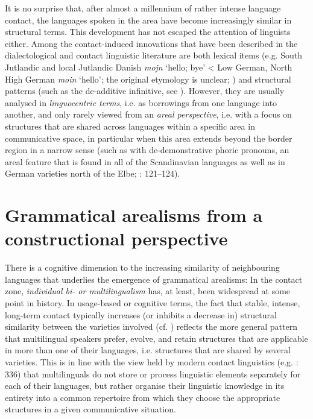 \documentclass[output=paper]{langsci/langscibook}
\begin{document}
It is no surprise that, after almost a millennium of rather intense language contact, the languages spoken in the area have become increasingly similar in structural terms. This development has not escaped the attention of linguists either. Among the contact-induced innovations that have been described in the dialectological and contact linguistic literature are both lexical items (e.g. South Jutlandic and local Jutlandic Danish \textit{mojn} ‘hello; bye’ < Low German, North High German \textit{moin} ‘hello’; the original etymology is unclear; \citealt{Pedersen.1995}) and structural patterns (such as the de-additive infinitive, see ). However, they are usually analysed in \textit{linguocentric terms}, i.e. as borrowings from one language into another, and only rarely viewed from an \textit{areal perspective}, i.e. with a focus on structures that are shared across languages within a specific area in communicative space, in particular when this area extends beyond the border region in a narrow sense (such as with de-demonstrative phoric pronouns, an areal feature that is found in all of the Scandinavian languages as well as in German varieties north of the Elbe; \citealt{Hoder.2016a}: 121–124).


\section{Grammatical arealisms from a constructional perspective} %
\label{sec:hoeder:3}

There is a cognitive dimension to the increasing similarity of neighbouring languages that underlies the emergence of grammatical arealisms: In the contact zone, \textit{individual bi- or multilingualism} has, at least, been widespread at some point in history. In usage-based or cognitive terms, the fact that stable, intense, long-term contact typically increases (or inhibits a decrease in) structural similarity between the varieties involved (cf. \citealt{Matras.2010}) reflects the more general pattern that multilingual speakers prefer, evolve, and retain structures that are applicable in more than one of their languages, i.e. structures that are shared by several varieties. This is in line with the view held by modern contact linguistics (e.g. \citealt{Matras.2020}: 336) that multilinguals do not store or process linguistic elements separately for each of their languages, but rather organise their linguistic knowledge in its entirety into a common repertoire from which they choose the appropriate structures in a given communicative situation.
\end{document}
